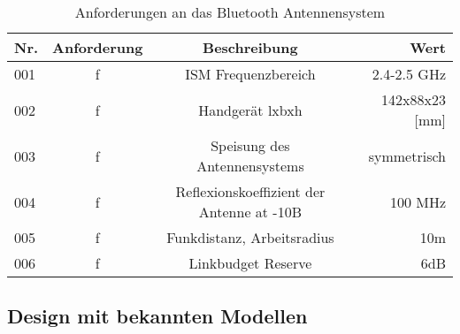 
\begin{table}[!ht]
\centering
\begin{tabular}{lccr} \toprule 
Nr. & Anforderung & Beschreibung & Wert   \\ 
\midrule
001 & f & ISM Frequenzbereich  & 2.4-2.5 GHz  \\ 
002 & f & Handgerät lxbxh & 142x88x23 [mm]    \\  
003 & f &  Speisung des Antennensystems & symmetrisch  \\  
004 & f & Reflexionskoeffizient der Antenne  at -10B & 100 MHz  \\ 
005 & f & Funkdistanz, Arbeitsradius & 10m   \\ 
006 & f & Linkbudget Reserve & 6dB   \\ 
\bottomrule
  \end{tabular}
  \caption{Anforderungen an das Bluetooth Antennensystem}
  \label{AnforderungenAntenneSystem}
\end{table} 

\subsection{Design mit bekannten Modellen}

